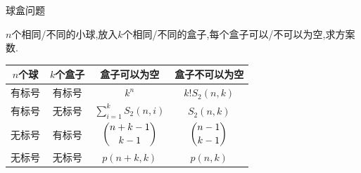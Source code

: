\documentclass[aspectratio=169]{beamer}  %
\newcommand{\pau}{\pause}
\begin{document}
\begin{frame}[fragile]{球盒问题}
    \begin{example}
        $n$个相同/不同的小球,放入$k$个相同/不同的盒子,每个盒子可以/不可以为空,求方案数.
    \end{example}\pau
    \begin{center}
   		\begin{tabular}{cc|cc}\hline
   			$n$个球&$k$个盒子&盒子可以为空&盒子不可以为空\\\hline
   			有标号&有标号&$k^n$&$k!S_2\left(n,k\right)$\\
   			有标号&无标号&$\sum\limits_{i=1}^kS_2\left(n,i\right)$&$S_2\left(n,k\right)$\\
   			无标号&有标号&$\dbinom{n+k-1}{k-1}$&$\dbinom{n-1}{k-1}$\\
   			无标号&无标号&$p\left(n+k,k\right)$&$p\left(n,k\right)$\\\hline			
   		\end{tabular}
   	\end{center}
\end{frame}
\end{document}
